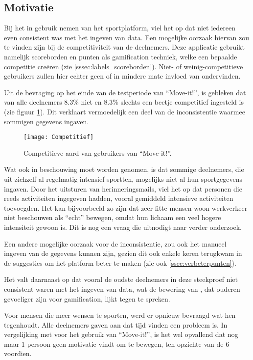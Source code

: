 \subsection{Motivatie}

Bij het in gebruik nemen van het sportplatform, viel het op dat niet iedereen even consistent was met het ingeven van data. Een mogelijke oorzaak hiervan zou te vinden zijn bij de competitiviteit van de deelnemers. Deze applicatie gebruikt namelijk scoreborden en punten als gamification techniek, welke een bepaalde competitie creëren (zie \ref{sssec:labels_scoreborden}). Niet- of weinig-competitieve gebruikers zullen hier echter geen of in mindere mate invloed van ondervinden.

Uit de bevraging op het einde van de testperiode van ``Move-it!'', is gebleken dat van alle deelnemers 8.3\% niet en 8.3\% slechts een beetje competitief ingesteld is (zie figuur \ref{fig:competitief}). Dit verklaart vermoedelijk een deel van de inconsistentie waarmee sommigen gegevens ingaven.

\begin{figure}[h]
    \caption[Competitieve aard van gebruikers van ``Move-it!'']{Competitieve aard van gebruikers van ``Move-it!''.}
    \texttt{[image: Competitief]}
    \label{fig:competitief}
\end{figure}

Wat ook in beschouwing moet worden genomen, is dat sommige deelnemers, die uit zichzelf al regelmatig intensief sportten, mogelijks niet al hun sportgegevens ingaven. Door het uitsturen van herinneringsmails, viel het op dat personen die reeds activiteiten ingegeven hadden, vooral gemiddeld intensieve activiteiten toevoegden. Het kan bijvoorbeeld zo zijn dat zeer fitte mensen woon-werkverkeer niet beschouwen als ``echt'' bewegen, omdat hun lichaam een veel hogere intensiteit gewoon is. Dit is nog een vraag die uitnodigt naar verder onderzoek.

Een andere mogelijke oorzaak voor de inconsistentie, zou ook het manueel ingeven van de gegevens kunnen zijn, gezien dit ook enkele keren terugkwam in de suggesties om het platform beter te maken (zie ook \ref{ssec:verbeterpunten}).

Het valt daarnaast op dat vooral de oudste deelnemers in deze steekproef niet consistent waren met het ingeven van data, wat de bewering van \textcite{PoloPena2020}, dat ouderen gevoeliger zijn voor gamification, lijkt tegen te spreken.

Voor mensen die meer wensen te sporten, werd er opnieuw bevraagd wat hen tegenhoudt. Alle deelnemers gaven aan dat tijd vinden een probleem is. In vergelijking met voor het gebruik van ``Move-it!'', is het wel opvallend dat nog maar 1 persoon geen motivatie vindt om te bewegen, ten opzichte van de 6 voordien.

